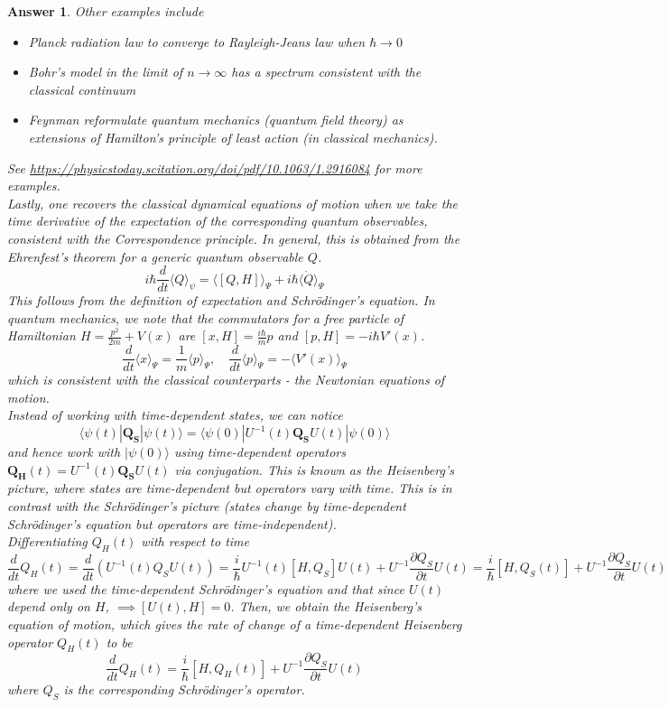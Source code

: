 \documentclass[a4paper]{article}
\newtheorem{ans}{Answer}[subsection]
\theoremstyle{new}
\begin{document}
\begin{ans}
Other examples include
\begin{itemize}
    \item Planck radiation law to converge to Rayleigh-Jeans law when $\hbar\rightarrow 0$
    \item Bohr's model in the limit of $n\rightarrow\infty$ has a spectrum consistent with the classical continuum
    \item Feynman reformulate quantum mechanics (quantum field theory) as extensions of Hamilton's principle of least action (in classical mechanics).
\end{itemize}
See \url{https://physicstoday.scitation.org/doi/pdf/10.1063/1.2916084} for more examples.\\[5pt]
Lastly, one recovers the classical dynamical equations of motion when we take the time derivative of the expectation of the corresponding quantum observables, consistent with the Correspondence principle. In general, this is obtained from the Ehrenfest's theorem for a generic quantum observable $Q$. 
$$i\hbar\frac{d}{dt}\langle Q\rangle_\psi=\langle [Q,H]\rangle_\Psi+i\hbar\langle\dot{Q}\rangle_\Psi$$
This follows from the definition of expectation and Schr\"{o}dinger's equation. In quantum mechanics, we note that the commutators for a free particle of Hamiltonian $H=\frac{p^2}{2m}+V(x)$ are $[x,H]=\frac{i\hbar}{m}p$ and $[p,H]=-i\hbar V'(x)$.
$$\frac{d}{dt}\langle x\rangle_\Psi=\frac{1}{m}\langle p\rangle_\Psi,\quad\frac{d}{dt}\langle p\rangle_\Psi=-\langle V'(x)\rangle_\Psi$$
which is consistent with the classical counterparts - the Newtonian equations of motion. \\[5pt]
Instead of working with time-dependent states, we can notice $$\langle\psi(t)|\mathbf{Q_S}|\psi(t)\rangle=\langle\psi(0)|U^{-1}(t)\mathbf{Q_S}U(t)|\psi(0)\rangle$$ and hence work with $|\psi(0)\rangle$ using time-dependent operators $\mathbf{Q_H}(t)=U^{-1}(t)\mathbf{Q_S}U(t)$ via conjugation. This is known as the Heisenberg's picture, where states are time-dependent but operators vary with time. This is in contrast with the Schr\"{o}dinger's picture (states change by time-dependent Schr\"{o}dinger's equation but operators are time-independent).\\[5pt]
Differentiating $Q_H(t)$ with respect to time
$$\frac{d}{dt}Q_H(t)=\frac{d}{dt}(U^{-1}(t)Q_SU(t))=\frac{i}{\hbar}U^{-1}(t)[H,Q_S]U(t)+U^{-1}\frac{\partial Q_S}{\partial t}U(t)=\frac{i}{\hbar}[H,Q_S(t)]+U^{-1}\frac{\partial Q_S}{\partial t}U(t)$$
where we used the time-dependent Schr\"{o}dinger's equation and that since $U(t)$ depend only on $H$, $\implies[U(t),H]=0$. Then, we obtain the Heisenberg's equation of motion, which gives the rate of change of a time-dependent Heisenberg operator $Q_H(t)$ to be
$$\frac{d}{dt}Q_H(t)=\frac{i}{\hbar}[H,Q_H(t)]+U^{-1}\frac{\partial Q_S}{\partial t}U(t)$$
where $Q_S$ is the corresponding Schr\"{o}dinger's operator.

\end{ans}
\end{document}

